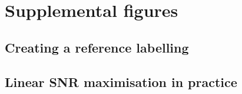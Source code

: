 
\chapter{Supplemental figures}


\section{Creating a reference labelling}

\begin{figure}
\label{fig:labellers_B}
\end{figure}


\section{Linear SNR maximisation in practice}
